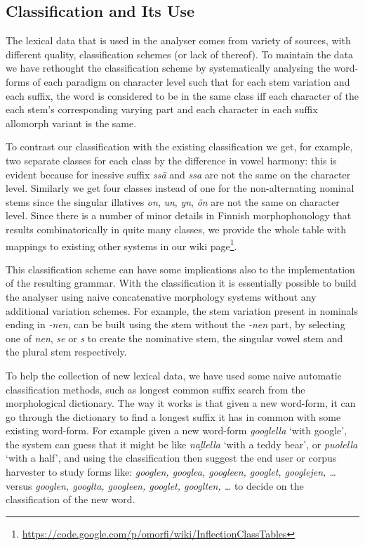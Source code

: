 \documentclass[a4paper,12pt]{article}
\begin{document}
\subsection{Classification and Its Use}

The lexical data that is used in the analyser comes from variety of sources,
with different quality, classification schemes (or lack of thereof).
To maintain the data we have rethought the classification scheme by
systematically analysing the word-forms of each paradigm on character level such
that for each stem variation and each suffix, the word is considered to be in
the same class iff each character of the each stem's corresponding varying part
and each character in each suffix allomorph variant is the same. 

To contrast our classification with the existing classification we get, for
example, two separate classes for each class by the difference in vowel
harmony: this is evident because for inessive suffix \emph{ssä} and \emph{ssa}
are not the same on the character level. Similarly we get four classes instead
of one for the non-alternating nominal stems since the singular illatives
\emph{on}, \emph{un}, \emph{yn}, \emph{ön} are not the same on character level.
Since there is a number of minor details in Finnish morphophonology that
results combinatorically in quite many classes, we provide the whole table with
mappings to existing other systems in our wiki
page\footnote{\url{https://code.google.com/p/omorfi/wiki/InflectionClassTables}}.

This classification scheme can have some implications also to the
implementation of the resulting grammar. With the classification it is
essentially possible to build the analyser using naive concatenative morphology
systems without any additional variation schemes. For example, the stem
variation present in nominals ending in \emph{-nen}, can be built using the
stem without the \emph{-nen} part, by selecting one of \emph{nen}, \emph{se} or
\emph{s} to create the nominative stem, the singular vowel stem and the plural
stem respectively.

To help the collection of new lexical data, we have used some naive
automatic classification methods, such as longest common suffix search from the
morphological dictionary.  The way it works is that given a new word-form, it
can go through the dictionary to find a longest suffix it has in common with
some existing word-form. For example  given a new word-form \emph{googlella}
`with google', the system can guess that it might be like \emph{naḷ̣lella} `with
a teddy bear', or \emph{puolella} `with a half', and using the classification
then suggest the end user or corpus harvester to study forms like:
\emph{googlen, googlea, googleen, googlet, googlejen, \ldots} versus
\emph{googlen, googlta, googleen, googlet, googlten, \ldots}
to decide on the classification of the new word.
\end{document}
